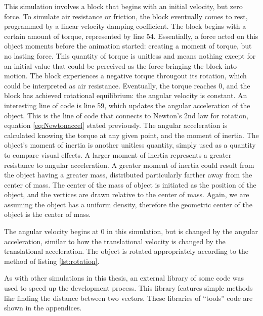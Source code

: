 This simulation involves a block that begins with an initial velocity, but zero force.  To simulate air resistance or friction, the block eventually comes to rest, programmed by a linear velocity damping coefficient.  The block begins with a certain amount of torque, represented by line 54.  Essentially, a force acted on this object moments before the animation started: creating a moment of torque, but no lasting force.  This quantity of torque is unitless and means nothing except for an initial value that could be perceived as the force bringing the block into motion.  The block experiences a negative torque througout its rotation, which could be interpreted as air resistance.  Eventually, the torque reaches 0, and the block has achieved rotational equilibrium: the angular velocity is constant.  An interesting line of code is line 59, which updates the angular acceleration of the object.  This is the line of code that connects to Newton's 2nd law for rotation, equation \ref{eq:Newtonaccel} stated previously.  The angular acceleration is calculated knowing the torque at any given point, and the moment of inertia.  The object's moment of inertia is another unitless quantity, simply used as a quantity to compare visual effects.  A larger moment of inertia represents a greater resistance to angular acceleration.  A greater moment of inertia could result from the object having a greater mass, distributed particularly farther away from the center of mass.  The center of the mass of object is initiated as the position of the object, and the vertices are drawn relative to the center of mass.  Again, we are assuming the object has a uniform density, therefore the geometric center of the object is the center of mass.  

The angular velocity begins at 0 in this simulation, but is changed by the angular acceleration, similar to how the translational velocity is changed by the translational acceleration.  The object is rotated appropriately according to the method of listing \ref{lst:rotation}.  

As with other simulations in this thesis, an external library of some code was used to speed up the development process.  This library features simple methods like finding the distance between two vectors.  These libraries of ``tools'' code are shown in the appendices.  



















